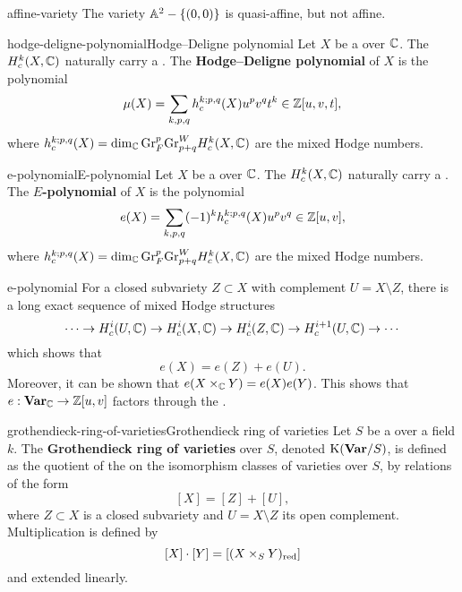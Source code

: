 \begin{example}{affine-variety}
    The variety $\AA^2 - \{ (0, 0) \}$ is quasi-affine, but not affine.
\end{example}

\begin{topic}{hodge-deligne-polynomial}{Hodge--Deligne polynomial}
    Let $X$ be a  over $\CC$. The  $H_c^k(X, \CC)$ naturally carry a . The \textbf{Hodge--Deligne polynomial} of $X$ is the polynomial
    \[ \mu(X) = \sum_{k, p, q} h_c^{k; p, q}(X) u^p v^q t^k \in \ZZ[u, v, t] , \]
    where $h_c^{k; p, q}(X) = \dim_\CC \textup{Gr}_F^p \textup{Gr}^W_{p + q} H_c^k(X, \CC)$ are the mixed Hodge numbers.
\end{topic}

\begin{topic}{e-polynomial}{E-polynomial}
    Let $X$ be a  over $\CC$. The  $H_c^k(X, \CC)$ naturally carry a . The \textbf{$E$-polynomial} of $X$ is the polynomial
    \[ e(X) = \sum_{k, p, q} (-1)^k h_c^{k; p, q}(X) u^p v^q \in \ZZ[u, v] , \]
    where $h_c^{k; p, q}(X) = \dim_\CC \textup{Gr}_F^p \textup{Gr}^W_{p + q} H_c^k(X, \CC)$ are the mixed Hodge numbers.
\end{topic}

\begin{example}{e-polynomial}
    For a closed subvariety $Z \subset X$ with complement $U = X \setminus Z$, there is a long exact sequence of mixed Hodge structures
    \[ \cdots \to H_c^i(U, \CC) \to H_c^i(X, \CC) \to H_c^i(Z, \CC) \to H_c^{i + 1}(U, \CC) \to \cdots \]
    which shows that
    \[ e(X) = e(Z) + e(U) . \]
    Moreover, it can be shown that $e(X \times_\CC Y) = e(X) e(Y)$. This shows that $e : \textbf{Var}_\CC \to \ZZ[u, v]$ factors through the .
\end{example}

\begin{topic}{grothendieck-ring-of-varieties}{Grothendieck ring of varieties}
    Let $S$ be a  over a field $k$. The \textbf{Grothendieck ring of varieties} over $S$, denoted $\textup{K}(\textbf{Var}/S)$, is defined as the quotient of the  on the isomorphism classes of varieties over $S$, by relations of the form
    \[ [X] = [Z] + [U] , \]
    where $Z \subset X$ is a closed subvariety and $U = X \setminus Z$ its open complement. Multiplication is defined by
    \[ [X] \cdot [Y] = [(X \times_S Y)_\textup{red}] \]
    and extended linearly.
\end{topic}

